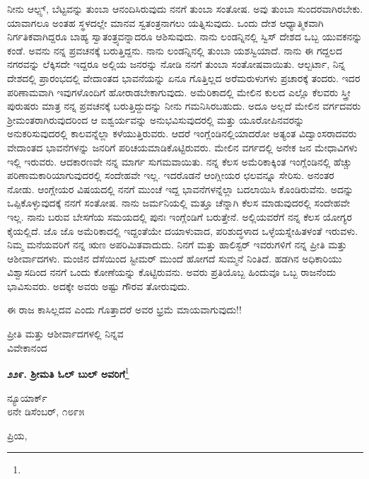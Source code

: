 ನೀನು ಆಲ್ಪ್ಸ್, ಬೆಟ್ಟವನ್ನು ತುಂಬಾ ಆನಂದಿಸಿರುವುದು ನನಗೆ ತುಂಬಾ ಸಂತೋಷ. ಅವು ತುಂಬಾ ಸುಂದರವಾಗಿರಬೇಕು. ಯಾವಾಗಲೂ ಅಂತಹ ಸ್ಥಳದಲ್ಲೇ ಮಾನವ ಸ್ವತಂತ್ರನಾಗಲು ಯತ್ನಿಸುವುದು. ಒಂದು ದೇಶ ಆಧ್ಯಾತ್ಮಿಕವಾಗಿ ನಿರ್ಗತಿಕವಾಗಿದ್ದರೂ ಬಾಹ್ಯ ಸ್ವಾತಂತ್ರ್ಯವನ್ನಾದರೂ ಆಶಿಸುವುದು. ನಾನು ಲಂಡನ್ನಿನಲ್ಲಿ ಸ್ವಿಸ್ ದೇಶದ ಒಬ್ಬ ಯುವಕನನ್ನು ಕಂಡೆ. ಅವನು ನನ್ನ ಪ್ರವಚನಕ್ಕೆ ಬರುತ್ತಿದ್ದನು. ನಾನು ಲಂಡನ್ನಿನಲ್ಲಿ ತುಂಬಾ ಯಶಸ್ವಿಯಾದೆ. ನಾನು ಈ ಗದ್ದಲದ ನಗರವನ್ನು ಲೆಕ್ಕಿಸದೇ ಇದ್ದರೂ ಅಲ್ಲಿಯ ಜನರನ್ನು ನೋಡಿ ನನಗೆ ತುಂಬಾ ಸಂತೋಷವಾಯಿತು. ಆಲ್ಬರ್ಟಾ, ನಿನ್ನ ದೇಶದಲ್ಲಿ ಪ್ರಾರಂಭದಲ್ಲಿ ವೇದಾಂತದ ಭಾವನೆಯನ್ನು ಏನೂ ಗೊತ್ತಿಲ್ಲದ ಅರೆಮರುಳುಗಳು ಪ್ರಚಾರಕ್ಕೆ ತಂದರು. ಇದರ ಪರಿಣಾಮವಾಗಿ ಇವುಗಳೊಂದಿಗೆ ಹೋರಾಡಬೇಕಾಗುವುದು. ಅಮೆರಿಕಾದಲ್ಲಿ ಮೇಲಿನ ಕುಲದ ಎಲ್ಲೊ ಕೆಲವರು ಸ್ತ್ರೀ ಪುರುಷರು ಮಾತ್ರ ನನ್ನ ಪ್ರವಚನಕ್ಕೆ ಬರುತ್ತಿದ್ದುದನ್ನು ನೀನು ಗಮನಿಸಿರಬಹುದು. ಅದೂ ಅಲ್ಲದೆ ಮೇಲಿನ ವರ್ಗದವರು ಶ‍್ರೀಮಂತರಾಗಿರುವುದರಿಂದ ಆ ಐಶ್ವರ್ಯವನ್ನು ಅನುಭವಿಸುವುದರಲ್ಲಿ ಮತ್ತು ಯೂರೋಪಿನವರನ್ನು ಅನುಕರಿಸುವುದರಲ್ಲಿ ಕಾಲವನ್ನೆಲ್ಲಾ ಕಳೆಯುತ್ತಿರುವರು. ಆದರೆ ಇಂಗ್ಲೆಂಡಿನಲ್ಲಿಯಾದರೋ ಅತ್ಯಂತ ವಿದ್ವಾಂಸರಾದವರು ವೇದಾಂತದ ಭಾವನೆಗಳನ್ನು ಜನರಿಗೆ ಪರಿಚಯಮಾಡಿಕೊಟ್ಟಿರುವರು. ಮೇಲಿನ ವರ್ಗದಲ್ಲಿ ಅನೇಕ ಜನ ಮೇಧಾವಿಗಳು ಇಲ್ಲಿ ಇರುವರು. ಆದಕಾರಣವೇ ನನ್ನ ಮಾರ್ಗ ಸುಗಮವಾಯಿತು. ನನ್ನ ಕೆಲಸ ಅಮೆರಿಕಾಕ್ಕಿಂತ ಇಂಗ್ಲೆಂಡಿನಲ್ಲಿ ಹೆಚ್ಚು ಪರಿಣಾಮಕಾರಿಯಾಗುವುದರಲ್ಲಿ ಸಂದೇಹವೇ ಇಲ್ಲ. ಇದರೊಡನೆ ಆಂಗ್ಲೀಯರ ಛಲವನ್ನೂ ಸೇರಿಸು. ಅನಂತರ ನೋಡು. ಆಂಗ್ಲೇಯರ ವಿಷಯದಲ್ಲಿ ನನಗೆ ಮುಂಚೆ ಇದ್ದ ಭಾವನೆಗಳನ್ನೆಲ್ಲಾ ಬದಲಾಯಿಸಿ ಕೊಂಡಿರುವೆನು. ಅದನ್ನು ಒಪ್ಪಿಕೊಳ್ಳುವುದಕ್ಕೆ ನನಗೆ ಸಂತೋಷ. ನಾನು ಜರ್ಮನಿಯಲ್ಲಿ ಮತ್ತೂ ಚೆನ್ನಾಗಿ ಕೆಲಸ ಮಾಡುವುದರಲ್ಲಿ ಸಂದೇಹವೇ ಇಲ್ಲ. ನಾನು ಬರುವ ಬೇಸಗೆಯ ಸಮಯದಲ್ಲಿ ಪುನಃ ಇಂಗ್ಲೆಂಡಿಗೆ ಬರುತ್ತೇನೆ. ಅಲ್ಲಿಯವರೆಗೆ ನನ್ನ ಕೆಲಸ ಯೋಗ್ಯರ ಕೈಯಲ್ಲಿದೆ. ಜೊ ಜೊ ಅಮೆರಿಕಾದಲ್ಲಿ ಇದ್ದಂತೆಯೇ ದಯಾಳುವಾದ, ಪರಿಶುದ್ಧಳಾದ ಒಳ್ಳೆಯಸ್ನೇಹಿತಳಂತೆ ಇರುವಳು. ನಿಮ್ಮ ಮನೆಯವರಿಗೆ ನನ್ನ ಋಣ ಅಪರಿಮಿತವಾದುದು. ನಿನಗೆ ಮತ್ತು ಹಾಲಿಸ್ಟರ್ ಇವರುಗಳಿಗೆ ನನ್ನ ಪ್ರೀತಿ ಮತ್ತು ಆಶೀರ್ವಾದಗಳು. ಮಂಜಿನ ದೆಸೆಯಿಂದ ಸ್ಟೀಮರ್ ಮುಂದೆ ಹೋಗದೆ ಸುಮ್ಮನೆ ನಿಂತಿದೆ. ಹಡಗಿನ ಅಧಿಕಾರಿಯು ವಿಶ್ವಾಸದಿಂದ ನನಗೆ ಒಂದು ಕೋಣೆಯನ್ನು ಕೊಟ್ಟಿರುವನು. ಅವರು ಪ್ರತಿಯೊಬ್ಬ ಹಿಂದುವೂ ಒಬ್ಬ ರಾಜನೆಂದು ಭಾವಿಸುವರು. ಅದಕ್ಕೇ ಅವರು ಅಷ್ಟು ಗೌರವ ತೋರುವುದು.

ಈ ರಾಜ ಕಾಸಿಲ್ಲದವ ಎಂದು ಗೊತ್ತಾದರೆ ಅವರ ಭ್ರಮೆ ಮಾಯವಾಗುವುದು!!

{\flushright
ಪ್ರೀತಿ ಮತ್ತು ಆಶೀರ್ವಾದಗಳಲ್ಲಿ ನಿನ್ನವ\\ವಿವೇಕಾನಂದ\par}

\begin{center}
\textbf{೨೨೯. ಶ‍್ರೀಮತಿ ಓಲ್ ಬುಲ್ ಅವರಿಗೆ}\footnote{}
\end{center}

\begin{flushright}
ನ್ಯೂಯಾರ್ಕ್\\೮ನೇ ಡಿಸೆಂಬರ್, ೧೮೯೫
\end{flushright}

\noindent
ಪ್ರಿಯ,

